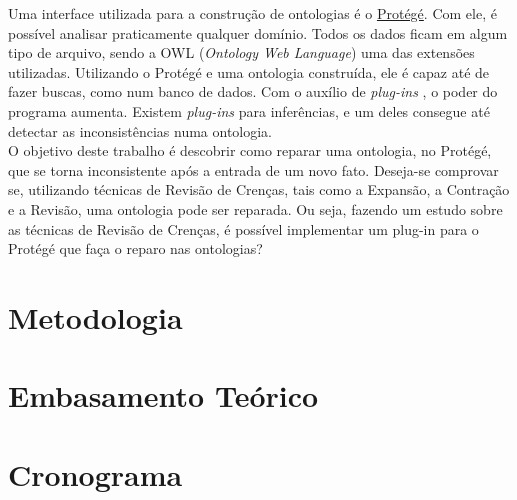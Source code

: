 \documentclass[12pt,letterpaper]{article}
\begin{document}
	Uma interface utilizada para a construção de ontologias é o \href{https://protege.stanford.edu/}{Protégé}. Com ele, é possível analisar praticamente qualquer domínio. Todos os dados ficam em algum tipo de arquivo, sendo a OWL (\textit{Ontology Web Language}) uma das extensões utilizadas. Utilizando o Protégé e uma ontologia construída, ele é capaz até de fazer buscas, como num banco de dados. Com o auxílio de \textit{plug-ins} \cite{resina2014belief} \cite{ribeiro2008}, o poder do programa aumenta. Existem \textit{plug-ins} para inferências, e um deles consegue até detectar as inconsistências \cite{cobe2014ontology} numa ontologia. \\
	
	O objetivo deste trabalho é descobrir como reparar uma ontologia, no Protégé, que se torna inconsistente após a entrada de um novo fato. Deseja-se comprovar se, utilizando técnicas de Revisão de Crenças, tais como a Expansão, a Contração e a Revisão, uma ontologia pode ser reparada. Ou seja, fazendo um estudo sobre as técnicas de Revisão de Crenças, é possível implementar um plug-in para o Protégé que faça o reparo nas ontologias? \\
	
	\clearpage
	
	\section{Metodologia}
	
	\section{Embasamento Teórico}
	
	\section{Cronograma}
	
	
	
	 
\end{document}
